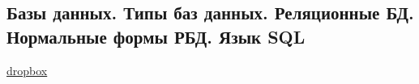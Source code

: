 \subsection{Базы данных. Типы баз данных. Реляционные БД. Нормальные формы РБД. Язык SQL}

\href{https://www.dropbox.com/sh/4st5b16mvdf8gkj/AACJWcRNv0lFmPzhlkMSxN7Va/Programming/12%20%D0%91%D0%B0%D0%B7%D1%8B%20%D0%B4%D0%B0%D0%BD%D0%BD%D1%8B%D1%85.pdf?dl=0}{dropbox}